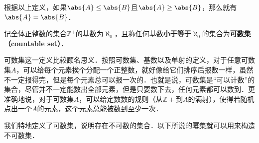 根据以上定义，如果$\abs{A}\leq\abs{B}$且$\abs{A}\geq\abs{B}$，那么就有$\abs{A}=\abs{B}$．

\begin{definition}{}
记全体正整数的集合$\mathbb{Z}^+$的基数为$\aleph_0$，且称任何基数\textbf{小于等于}$\aleph_0$的集合为\textbf{可数集（countable set）}．
\end{definition}

可数集这一定义比较顾名思义．按照可数集、基数以及单射的定义，对于任意可数集$A$，可以给每个元素挨个分配一个正整数，就好像给它们排序后报数一样，虽然不一定报得完，但是每个元素总可以报一次的．也就是说，可数集是“可以计数”的集合，尽管并不一定能数出全部元素，但是只要数下去，任何元素都可以数到．更准确地说，对于可数集$A$，可以给定数数的规则（从$\mathbb{Z}+$到$A$的满射），使得若随机点出一个$A$的元素，这个元素总能被数到至少一次．

我们特地定义了可数集，说明存在不可数的集合．以下所说的幂集就可以用来构造不可数集．















